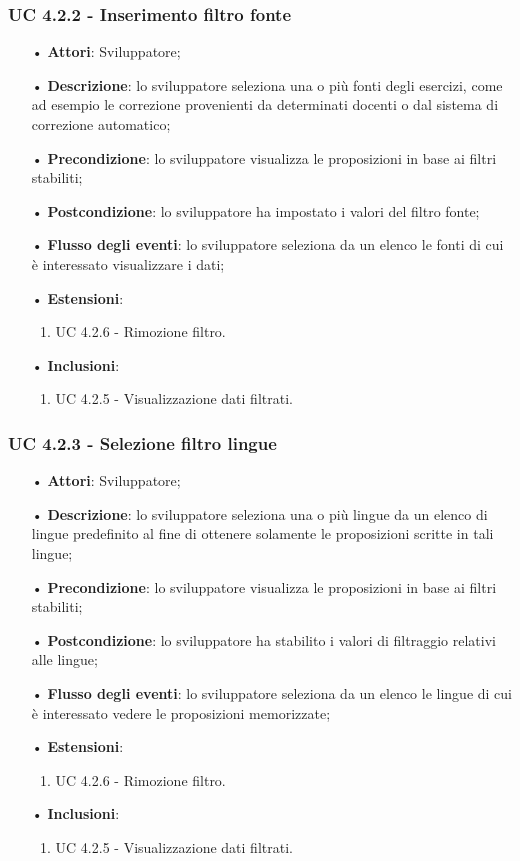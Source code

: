 \subsubsection{UC 4.2.2 - Inserimento filtro fonte}
\begin{itemize}
\item[•]\textbf{Attori}: Sviluppatore;
\item[•]\textbf{Descrizione}: lo sviluppatore seleziona una o più fonti degli esercizi, come ad esempio le correzione provenienti da determinati docenti o dal sistema di correzione automatico;
\item[•]\textbf{Precondizione}: lo sviluppatore visualizza le proposizioni in base ai filtri stabiliti;
\item[•]\textbf{Postcondizione}: lo sviluppatore ha impostato i valori del filtro fonte;
\item[•]\textbf{Flusso degli eventi}: lo sviluppatore seleziona da un elenco le fonti di cui è interessato visualizzare i dati;
\item[•]\textbf{Estensioni}: 
\begin{enumerate}
	\item UC 4.2.6 - Rimozione filtro.
\end{enumerate}
\item[•]\textbf{Inclusioni}:
\begin{enumerate}
\item UC 4.2.5 - Visualizzazione dati filtrati.
\end{enumerate}
\end{itemize}

\subsubsection{UC 4.2.3 -  Selezione filtro lingue}
\begin{itemize}
\item[•]\textbf{Attori}: Sviluppatore;
\item[•]\textbf{Descrizione}: lo sviluppatore seleziona una o più lingue da un elenco di lingue predefinito al fine di ottenere solamente le proposizioni scritte in tali lingue;
\item[•]\textbf{Precondizione}: lo sviluppatore visualizza le proposizioni in base ai filtri stabiliti;
\item[•]\textbf{Postcondizione}: lo sviluppatore ha stabilito i valori di filtraggio relativi alle lingue;
\item[•]\textbf{Flusso degli eventi}: lo sviluppatore seleziona da un elenco le lingue di cui è interessato vedere le proposizioni memorizzate;
\item[•]\textbf{Estensioni}: 
\begin{enumerate}
	\item UC 4.2.6 - Rimozione filtro.
\end{enumerate}
\item[•]\textbf{Inclusioni}:
\begin{enumerate}
\item UC 4.2.5 - Visualizzazione dati filtrati.
\end{enumerate}
\end{itemize}

